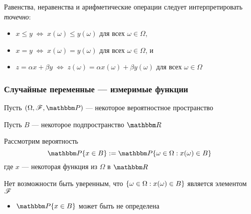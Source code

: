 \begin{frame}

    \vspace{2em}
    Равенства, неравенства и арифметические операции следует интерпретировать \emph{точечно}:
    \begin{itemize}
        \item $x \leq y \; \iff \; x(\omega) \leq y(\omega)$ для всех $\omega \in
        \Omega$,
        \item $x = y \; \iff \; x(\omega) = y(\omega)$ для всех $\omega \in
        \Omega$, и
        \item $z = \alpha x + \beta y \; \iff \; z(\omega) = \alpha x(\omega) +
            \beta y(\omega)$ для всех $\omega \in \Omega$
    \end{itemize}

\end{frame}

\begin{frame}\frametitle{Случайные переменные --- измеримые функции}

    \vspace{2em}
    Пусть $(\Omega, \fF, \PP)$ --- некоторое вероятностное пространство
    
    Пусть $B$ --- некоторое подпространство $\RR$
    
    Рассмотрим вероятность
    \begin{equation*}
        \PP\{x \in B\}
        := \PP\setntn{\omega \in \Omega}{x(\omega) \in B}
    \end{equation*}
   	где $x$ --- некоторая функция из $\Omega$ в $\RR$
    
    Нет возможности быть уверенным, что $\{ \omega \in \Omega : x(\omega) \in B \}$ 
    является элементом $\mathscr F$
    \begin{itemize}
        \item $\PP\{x \in B\}$ может быть не определена
    \end{itemize}
    
\end{frame}

